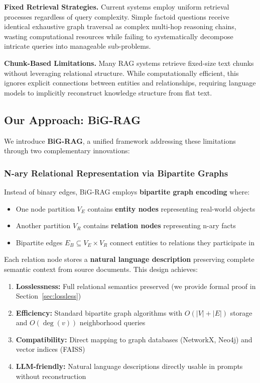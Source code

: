 \documentclass[11pt,a4paper]{article}
\begin{document}
\textbf{Fixed Retrieval Strategies.} Current systems employ uniform retrieval processes regardless of query complexity. Simple factoid questions receive identical exhaustive graph traversal as complex multi-hop reasoning chains, wasting computational resources while failing to systematically decompose intricate queries into manageable sub-problems.

\textbf{Chunk-Based Limitations.} Many RAG systems retrieve fixed-size text chunks without leveraging relational structure. While computationally efficient, this ignores explicit connections between entities and relationships, requiring language models to implicitly reconstruct knowledge structure from flat text.

\subsection{Our Approach: BiG-RAG}

We introduce \textbf{BiG-RAG}, a unified framework addressing these limitations through two complementary innovations:

\subsubsection{N-ary Relational Representation via Bipartite Graphs}

Instead of binary edges, BiG-RAG employs \textbf{bipartite graph encoding} where:

\begin{itemize}
    \item One node partition $V_E$ contains \textbf{entity nodes} representing real-world objects
    \item Another partition $V_R$ contains \textbf{relation nodes} representing n-ary facts
    \item Bipartite edges $E_B \subseteq V_E \times V_R$ connect entities to relations they participate in
\end{itemize}

Each relation node stores a \textbf{natural language description} preserving complete semantic context from source documents. This design achieves:

\begin{enumerate}
    \item \textbf{Losslessness:} Full relational semantics preserved (we provide formal proof in Section~\ref{sec:lossless})
    \item \textbf{Efficiency:} Standard bipartite graph algorithms with $O(|V| + |E|)$ storage and $O(\deg(v))$ neighborhood queries
    \item \textbf{Compatibility:} Direct mapping to graph databases (NetworkX, Neo4j) and vector indices (FAISS)
    \item \textbf{LLM-friendly:} Natural language descriptions directly usable in prompts without reconstruction
\end{enumerate}
\end{document}
